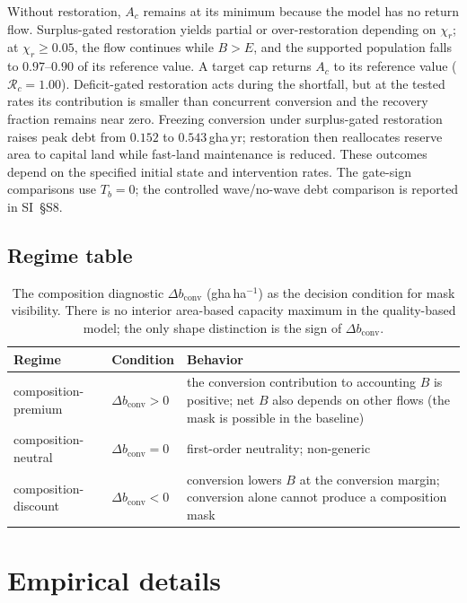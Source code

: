 \documentclass[11pt,a4paper]{article}
\newcommand{\dconv}{\Delta b_{\mathrm{conv}}}
\begin{document}
Without restoration, $A_c$ remains at its minimum because the model has no return flow. Surplus-gated restoration yields partial or over-restoration depending on $\chi_r$; at $\chi_r\ge0.05$, the flow continues while $B>E$, and the supported population falls to $0.97$--$0.90$ of its reference value. A target cap returns $A_c$ to its reference value ($\mathcal R_c=1.00$). Deficit-gated restoration acts during the shortfall, but at the tested rates its contribution is smaller than concurrent conversion and the recovery fraction remains near zero. Freezing conversion under surplus-gated restoration raises peak debt from $0.152$ to $0.543$\,gha\,yr; restoration then reallocates reserve area to capital land while fast-land maintenance is reduced. These outcomes depend on the specified initial state and intervention rates. The gate-sign comparisons use $T_b=0$; the controlled wave/no-wave debt comparison is reported in SI~\S S8.\par\pagebreak

\subsection{Regime table}\label{si:regimes}

\begin{table}[H]
\centering\small
\caption{The composition diagnostic $\dconv$ (gha\,ha$^{-1}$) as the decision condition for mask visibility. There is no interior area-based capacity maximum in the quality-based model; the only shape distinction is the sign of $\dconv$.}
\label{tab:si_regime}
\begin{tabularx}{\textwidth}{l l X}
\toprule
Regime & Condition & Behavior \\
\midrule
composition-premium & $\dconv>0$ & the conversion contribution to accounting $B$ is positive; net $B$ also depends on other flows (the mask is possible in the baseline) \\
composition-neutral & $\dconv=0$ & first-order neutrality; non-generic \\
composition-discount & $\dconv<0$ & conversion lowers $B$ at the conversion margin; conversion alone cannot produce a composition mask \\
\bottomrule
\end{tabularx}
\end{table}

\section{Empirical details}\label{si:empirical}
\end{document}
